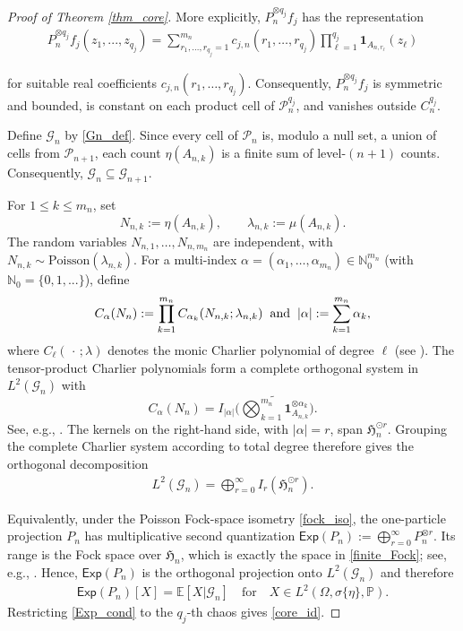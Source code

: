 \documentclass[ECP,preprint]{ejpecp}
\newcommand{\E}{\mathbb{E}}
\newcommand{\PP}{\mathbb{P}}
\newcommand{\N}{\mathbb{N}}
\newcommand{\ind}{\mathbf{1}}
\newcommand{\cG}{\mathcal{G}}
\newcommand{\AND}{\hspace{2mm}{\rm and}\hspace{2mm}}
\newcommand{\fH}{\mathfrak{H}}
\newcommand{\noi}{\noindent}
\newcommand{\s}{\sigma}
\newcommand{\wt}{\widetilde}
\begin{document}
\begin{proof}[Proof of Theorem \ref{thm_core}]
More explicitly, $P_n^{\otimes q_j}f_j$ has the representation
\noi
\begin{align*}
P_n^{\otimes q_j}f_j(z_1, ..., z_{q_j})
=
\sum_{r_1,\ldots,r_{q_j}=1}^{m_n}
c_{j,n}(r_1,\ldots,r_{q_j})
\prod_{\ell=1}^{q_j}
\ind_{A_{n,r_\ell}}(z_\ell)
\end{align*}

\noi
for suitable real coefficients
$c_{j,n}(r_1,\ldots,r_{q_j})$.  Consequently,
$P_n^{\otimes q_j}f_j$ is symmetric and bounded, is constant on
each product cell of $\mathcal P_n^{q_j}$, and vanishes outside
$C_n^{q_j}$.

Define $\cG_n$ by \eqref{Gn_def}.  Since every cell of
$\mathcal P_n$ is, modulo a null set, a union of cells from
$\mathcal P_{n+1}$, each count $\eta(A_{n,k})$ is a finite sum of
level-$(n+1)$ counts.  Consequently,
$
\cG_n\subseteq\cG_{n+1}.
$

For $1\leq k\leq m_n$, set
\[
N_{n,k}:=\eta(A_{n,k}),
\qquad
\lambda_{n,k}:=\mu(A_{n,k}).
\]
The random variables $N_{n,1},\ldots,N_{n,m_n}$ are independent,
with $N_{n,k}\sim\text{Poisson}(\lambda_{n,k})$.  For a
multi-index
$\alpha=(\alpha_1,\ldots,\alpha_{m_n})\in\N_0^{m_n}$ (with $\N_0=\{0,1, ... \}$), 
define
\[
C_\alpha(N_n)
:=
\prod_{k=1}^{m_n}
C_{\alpha_k}(N_{n,k};\lambda_{n,k})
\AND
|\alpha|
:=
\sum_{k=1}^{m_n}\alpha_k,
\]
where $C_\ell(\,\cdot\,;\lambda)$ denotes the  monic  Charlier
polynomial of degree $\ell$
(see \cite[Def.~6.2.7]{Pri09}). 
  The tensor-product Charlier
polynomials form a complete orthogonal system in $L^2(\cG_n)$
with
\[
C_\alpha(N_n)
=
I_{|\alpha|} \Big(\wt{\bigotimes_{k=1}^{m_n} \ind_{A_{n,k}}^{\otimes\alpha_k}} \Big).
\]
See, e.g., 
\cite[Prop.~6.2.9 and
Lem.~6.2.10]{Pri09}. 
The kernels on the right-hand side, with $|\alpha|=r$, span
$\fH_n^{\odot r}$.  Grouping the complete Charlier system according
to total degree therefore gives the orthogonal decomposition
\begin{align}
L^2(\cG_n)
=
\bigoplus_{r=0}^{\infty}
I_r(\fH_n^{\odot r}).
\label{finite_Fock}
\end{align}


\noi
Equivalently, under the Poisson Fock-space isometry \eqref{fock_iso}, the
one-particle projection $P_n$ has multiplicative second quantization
$
  \textsf{Exp}(P_n)
  :=\bigoplus_{r=0}^{\infty}P_n^{\otimes r}.
$
Its range is the Fock space over $\fH_n$, which is exactly the space in
\eqref{finite_Fock};
see, e.g., \cite[Section 5]{Surg84}.  Hence, $\textsf{Exp}(P_n)$ is the
orthogonal projection onto $L^2(\cG_n)$ and therefore
\begin{align}
  \textsf{Exp}(P_n)[X]
  =\E[X|\cG_n]
\quad  \text{for}\quad X\in L^2(\Omega,\s\{\eta\}, \PP).
  \label{Exp_cond}
\end{align}
 Restricting \eqref{Exp_cond} to the
$q_j$-th chaos gives \eqref{core_id}.
 



\end{proof}
\end{document}
